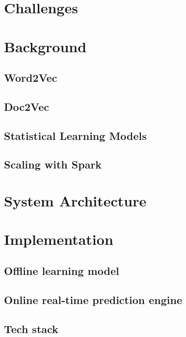 \documentclass[conference]{IEEEtran}
\begin{document}
\section{Challenges}


\section{Background}

\subsection{Word2Vec}

\subsection{Doc2Vec}

\subsection{Statistical Learning Models}

\subsection{Scaling with Spark}





\section{System Architecture}


\section{Implementation}

\subsection{Offline learning model}

\subsection{Online real-time prediction engine}

\subsection{Tech stack}
\end{document}
